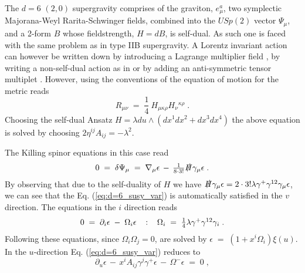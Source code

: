 \documentclass[a4paper,12pt]{article}
\begin{document}
%
%
\par
The $d=6$ $(2,0)$ supergravity comprises of the graviton, $e_{\mu}^{a}$, two symplectic Majorana-Weyl Rarita-Schwinger
fields, combined into the $USp(2)$ vector $\Psi_{\mu}$, and a 2-form $B$ whose fieldstrength, $H=dB$, is self-dual. 
As such one is faced with the same problem as
in type IIB supergravity. A Lorentz invariant action can however be written down by introducing
a Lagrange multiplier field \cite{art:KM}, by writing a non-self-dual action as in \cite{art:BHO} or by 
adding an anti-symmetric tensor multiplet \cite{art:MS}. However, using the conventions of \cite{art:NS} 
the equation of motion for the metric reads
\begin{equation}
\label{eq:EOM_d=6_N=2}
  R_{\mu\nu} \;=\; \textstyle{\frac{1}{4}}\ H_{\mu\kappa\rho}H_{\nu}{}^{\kappa\rho} \; .
\end{equation}
Choosing the self-dual Ansatz $H= \lambda du\wedge\left(dx^{1}dx^{2}+dx^{3}dx^{4}\right)$ the above equation is 
solved by choosing $2\eta^{ij}A_{ij}=-\lambda^{2}$.
\par
The Killing spinor equations in this case read
\begin{equation}
\label{eq:d=6_susy_var}
 0\;=\; \delta\Psi_{\mu} \;=\; \nabla_{\mu}\epsilon \,-\, 
        \textstyle{\frac{1}{8\cdot 3!}}\slashed{H}\gamma_{\mu}\epsilon \; .
\end{equation}
By observing that due to the self-duality of $H$ we have $\slashed{H}\gamma_{\mu}\epsilon=
2\cdot 3!\lambda\gamma^{+}\gamma^{12}\gamma_{\mu}\epsilon$, we can see that the Eq. (\ref{eq:d=6_susy_var})
is automatically satisfied in the $v$ direction. The equations in the $i$ direction reads
\begin{equation}
 0\;=\; \partial_{i}\epsilon \;-\; \Omega_{i}\epsilon \hspace{.3cm}:\hspace{.3cm} 
        \Omega_{i} \;=\; \textstyle{\frac{1}{4}}\lambda\gamma^{+}\gamma^{12}\gamma_{i} \; .
\end{equation}
{}Following \cite{art:blau,art:FP} these equations, since $\Omega_{i}\Omega_{j}=0$, are solved by
$\epsilon \;=\; \left( 1+x^{i}\Omega_{i}\right)\xi (u)$.
In the $u$-direction Eq. (\ref{eq:d=6_susy_var}) reduces to
\begin{equation}
\partial_{u}\epsilon\,-\, x^{i}A_{ij}\gamma^{j}\gamma^{+}\epsilon \,-\, \Omega^{-}\epsilon \;=\; 0 \; , 
\end{equation}
\end{document}
